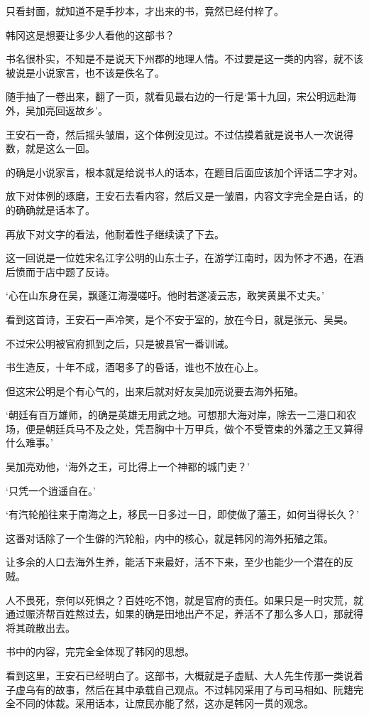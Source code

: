 只看封面，就知道不是手抄本，才出来的书，竟然已经付梓了。

韩冈这是想要让多少人看他的这部书？

书名很朴实，不知是不是说天下州郡的地理人情。不过要是这一类的内容，就不该被说是小说家言，也不该是佚名了。

随手抽了一卷出来，翻了一页，就看见最右边的一行是‘第十九回，宋公明远赴海外，吴加亮回返故乡’。

王安石一奇，然后摇头皱眉，这个体例没见过。不过估摸着就是说书人一次说得数，就是这么一回。

的确是小说家言，根本就是给说书人的话本，在题目后面应该加个评话二字才对。

放下对体例的琢磨，王安石去看内容，然后又是一皱眉，内容文字完全是白话，的的确确就是话本了。

再放下对文字的看法，他耐着性子继续读了下去。

这一回说是一位姓宋名江字公明的山东士子，在游学江南时，因为怀才不遇，在酒后愤而于店中题了反诗。

‘心在山东身在吴，飘蓬江海漫嗟吁。他时若遂凌云志，敢笑黄巢不丈夫。’

看到这首诗，王安石一声冷笑，是个不安于室的，放在今日，就是张元、吴昊。

不过宋公明被官府抓到之后，只是被县官一番训诫。

书生造反，十年不成，酒喝多了的昏话，谁也不放在心上。

但这宋公明是个有心气的，出来后就对好友吴加亮说要去海外拓殖。

‘朝廷有百万雄师，的确是英雄无用武之地。可想那大海对岸，除去一二港口和农场，便是朝廷兵马不及之处，凭吾胸中十万甲兵，做个不受管束的外藩之王又算得什么难事。’

吴加亮劝他，‘海外之王，可比得上一个神都的城门吏？’

‘只凭一个逍遥自在。’

‘有汽轮船往来于南海之上，移民一日多过一日，即使做了藩王，如何当得长久？’

这番对话除了一个生僻的汽轮船，内中的核心，就是韩冈的海外拓殖之策。

让多余的人口去海外生养，能活下来最好，活不下来，至少也能少一个潜在的反贼。

人不畏死，奈何以死惧之？百姓吃不饱，就是官府的责任。如果只是一时灾荒，就通过赈济帮百姓熬过去，如果的确是田地出产不足，养活不了那么多人口，那就得将其疏散出去。

书中的内容，完完全全体现了韩冈的思想。

看到这里，王安石已经明白了。这部书，大概就是子虚赋、大人先生传那一类说着子虚乌有的故事，然后在其中承载自己观点。不过韩冈采用了与司马相如、阮籍完全不同的体裁。采用话本，让庶民亦能了然，这亦是韩冈一贯的观念。

